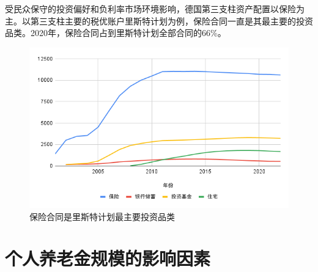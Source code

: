 \documentclass[a4paper,zihao=5]{ctexart}
\begin{document}
受民众保守的投资偏好和负利率市场环境影响，德国第三支柱资产配置以保险为主。以第三支柱主要的税优账户里斯特计划为例，保险合同一直是其最主要的投资品类。2020年，保险合同占到里斯特计划全部合同的66\%。
\begin{figure}[H]
    \centering
    \includegraphics[width=\linewidth]{img/保险合同是里斯特计划最主要投资品类.png}
    \caption{保险合同是里斯特计划最主要投资品类}
\end{figure}
\section{个人养老金规模的影响因素}
\end{document}
